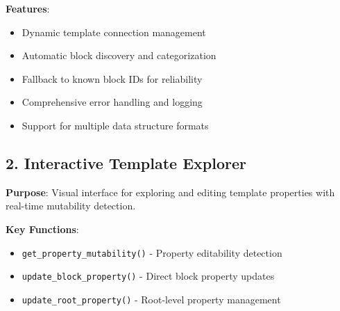 \documentclass[12pt,a4paper]{article}
\begin{document}
\textbf{Features}:
\begin{itemize}
    \item Dynamic template connection management
    \item Automatic block discovery and categorization
    \item Fallback to known block IDs for reliability
    \item Comprehensive error handling and logging
    \item Support for multiple data structure formats
\end{itemize}

\subsection{2. Interactive Template Explorer}

\textbf{Purpose}: Visual interface for exploring and editing template properties with real-time mutability detection.

\textbf{Key Functions}:
\begin{itemize}
    \item \texttt{get\_property\_mutability()} - Property editability detection
    \item \texttt{update\_block\_property()} - Direct block property updates
    \item \texttt{update\_root\_property()} - Root-level property management
\end{itemize}
\end{document}
